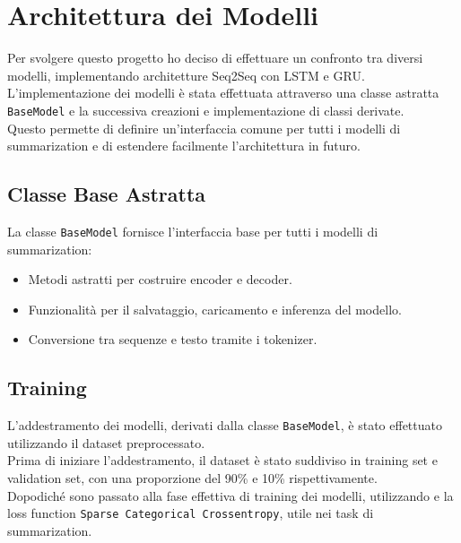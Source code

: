 

\section{Architettura dei Modelli}
Per svolgere questo progetto ho deciso di effettuare un confronto tra diversi modelli, implementando architetture Seq2Seq con LSTM e GRU.\\
L'implementazione dei modelli è stata effettuata attraverso una classe astratta \texttt{BaseModel} e la successiva creazioni e implementazione di classi derivate.\\
Questo permette di definire un'interfaccia comune per tutti i modelli di summarization e di estendere facilmente l'architettura in futuro.\\

\subsection{Classe Base Astratta}
La classe \texttt{BaseModel} fornisce l'interfaccia base per tutti i modelli di summarization:
\begin{itemize}
    \item Metodi astratti per costruire encoder e decoder.
    \item Funzionalità per il salvataggio, caricamento e inferenza del modello.
    \item Conversione tra sequenze e testo tramite i tokenizer.
\end{itemize}

\subsection{Training}
L'addestramento dei modelli, derivati dalla classe \texttt{BaseModel}, è stato effettuato utilizzando il dataset preprocessato.\\
Prima di iniziare l'addestramento, il dataset è stato suddiviso in training set e validation set, con una proporzione del 90\% e 10\% rispettivamente.\\
Dopodiché sono passato alla fase effettiva di training dei modelli, utilizzando e la loss function \texttt{Sparse Categorical Crossentropy}, utile nei task di summarization.\\

